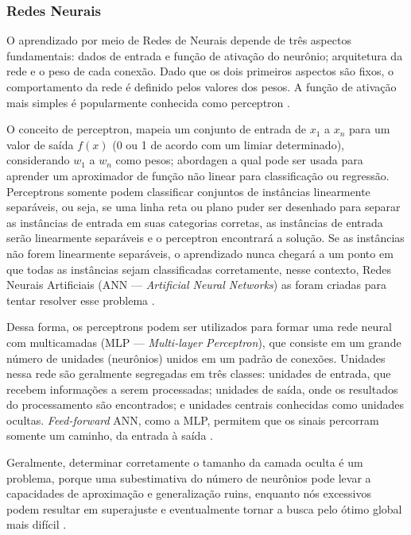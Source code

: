 \documentclass[
	12pt,				%
	oneside,			%
	a4paper,			%
	english,			%
	brazil				%
	]{abntex2ppgsi}
\begin{document}
\subsubsection{Redes Neurais}

O aprendizado por meio de Redes de Neurais depende de três aspectos fundamentais: dados de entrada e função de ativação do neurônio; arquitetura da rede e o peso de cada conexão. Dado que os dois primeiros aspectos são fixos, o comportamento da rede é definido pelos valores  dos pesos. A função de ativação mais simples é popularmente conhecida como perceptron \cite{kotsiantis2006machine}.

O conceito de perceptron, mapeia um conjunto de entrada de $x_1$ a $x_n$ para um valor de saída $f(x)$ (0 ou 1 de acordo com um limiar determinado), considerando $w_1$ a $w_n$ como pesos; abordagen a qual pode ser usada para aprender um aproximador de função não linear para classificação ou regressão. Perceptrons somente podem classificar conjuntos de instâncias linearmente separáveis, ou seja, se uma linha reta ou plano puder ser desenhado para separar as instâncias de entrada em suas categorias corretas, as instâncias de entrada serão linearmente separáveis e o perceptron encontrará a solução. Se as instâncias não forem linearmente separáveis, o aprendizado nunca chegará a um ponto em que todas as instâncias sejam classificadas corretamente, nesse contexto, Redes Neurais Artificiais (ANN --- \textit{Artificial Neural Networks}) as foram criadas para tentar resolver esse problema \cite{kotsiantis2006machine, singh2016review}. 

Dessa forma, os perceptrons podem ser utilizados para formar uma rede neural com multicamadas (MLP --- \textit{Multi-layer Perceptron}), que consiste em um grande número de unidades (neurônios) unidos em um padrão de conexões. Unidades nessa rede são geralmente segregadas em três classes: unidades de entrada, que recebem informações a serem processadas; unidades de saída, onde os resultados do processamento são encontrados; e unidades centrais conhecidas como unidades ocultas. \textit{Feed-forward} ANN, como a MLP, permitem que os sinais percorram somente um caminho, da entrada à saída  \cite{kotsiantis2006machine}.

Geralmente, determinar corretamente o tamanho da camada oculta é um problema, porque uma subestimativa do número de neurônios pode levar a capacidades de aproximação e generalização ruins, enquanto nós excessivos podem resultar em superajuste e eventualmente tornar a busca pelo ótimo global mais difícil  \cite{kotsiantis2006machine}.
\end{document}
